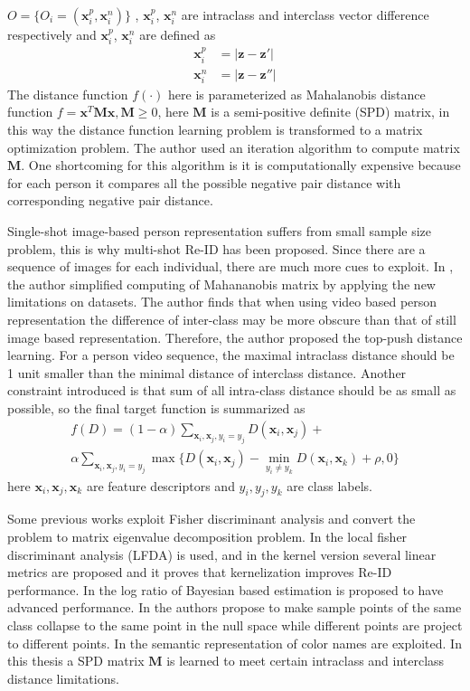 $O=\{O_i=(\bm{x}_i^p, \bm{x}_i^n)\}$ , $\bm{x}_i^p$, $\bm{x}_i^n$ are intraclass and interclass vector difference respectively and $\bm{x}_i^p$, $\bm{x}_i^n$ are defined as
\begin{equation}
\begin{aligned}
\bm{x}_i^p &= |\bm{z} - \bm{z}'| \\
\bm{x}_i^n &= |\bm{z} - \bm{z}''| 
\end{aligned}
\end{equation}
The distance function $f(\cdot)$ here is parameterized as Mahalanobis distance function
$f=\bm{x}^T\bm{M}\bm{x},\bm{M\ge}0$,
here $\bm{M}$ is a semi-positive definite (SPD) matrix, in this way the distance function learning problem is transformed to a matrix optimization problem. The author used an iteration algorithm to compute matrix $\bm{M}$. One shortcoming for this algorithm is it is computationally expensive because for each person it compares all the possible negative pair distance with corresponding negative pair distance. 

Single-shot image-based person representation suffers from small sample size problem, this is why multi-shot Re-ID has been proposed. Since there are a sequence of images for each individual, there are much more cues to exploit.
In \cite{TDL}, the author simplified computing of Mahananobis matrix by applying the new limitations on datasets. The author finds that when using video based person representation the difference of inter-class may be more obscure than that of still image based representation. Therefore, the author proposed the top-push distance learning. For a person video sequence, the maximal intraclass distance should be 1 unit smaller than the minimal distance of interclass distance. Another constraint introduced is that sum of all intra-class distance should be as small as possible, so the final target function is summarized as 
\begin{equation}
\begin{aligned}
f(D) = (1-\alpha)\sum_{\bm{x}_i,\bm{x}_j,y_i=y_j} D(\bm{x}_i,\bm{x}_j) + \\
\alpha \sum_{\bm{x}_i,\bm{x}_j,y_i=y_j}\max\{{D(\bm{x}_i,\bm{x}_j)-\min_{y_i\ne y_k}{D(\bm{x}_i,\bm{x}_k)}+\rho,0}\}
\end{aligned}
\end{equation}
here $\bm{x}_i, \bm{x}_j, \bm{x}_k$ are feature descriptors and $y_i, y_j, y_k$ are class labels.

Some previous works exploit Fisher discriminant analysis and convert the problem to matrix eigenvalue decomposition problem. In \cite{LFDA} the local fisher discriminant analysis (LFDA) is used, and in \cite{KernelVersionMetrics} the kernel version several linear metrics are proposed and it proves that kernelization improves Re-ID performance. In \cite{LOMO} the log ratio of Bayesian based estimation is proposed to have advanced performance. In \cite{NFST} the authors propose to make sample points of the same class collapse to the same point in the null space while different points are project to different points. In \cite{SCNCD} the semantic representation of color names are exploited. In this thesis a SPD matrix $\bm{M}$ is learned to meet certain intraclass and interclass distance limitations. 


